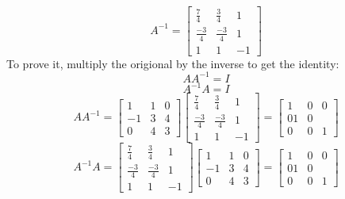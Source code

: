 \begin{example}
	\[\boxed{A^{-1} = \begin{bmatrix} \frac{7}{4} & \frac{3}{4} & 1\\ \frac{-3}{4} & \frac{-3}{4} & 1 \\ 1 & 1 & -1 \end{bmatrix} }\]
	To prove it, multiply the origional by the inverse to get the identity:
	\[A A^{-1} = I\]
	\[A^{-1} A = I\]
	\[A A^{-1} = \begin{bmatrix} 1 & 1 & 0 \\ -1 & 3 & 4 \\ 0 & 4 & 3 \end{bmatrix}\begin{bmatrix} \frac{7}{4} & \frac{3}{4} & 1\\ \frac{-3}{4} & \frac{-3}{4} & 1 \\ 1 & 1 & -1 \end{bmatrix} = \begin{bmatrix} 1& 0 & 0 \\ 0 1 & 0 \\ 0 & 0 & 1 \end{bmatrix} \]
	\[ A^{-1} A= \begin{bmatrix} \frac{7}{4} & \frac{3}{4} & 1\\ \frac{-3}{4} & \frac{-3}{4} & 1 \\ 1 & 1 & -1 \end{bmatrix}\begin{bmatrix} 1 & 1 & 0 \\ -1 & 3 & 4 \\ 0 & 4 & 3 \end{bmatrix} = \begin{bmatrix} 1& 0 & 0 \\ 0 1 & 0 \\ 0 & 0 & 1 \end{bmatrix} \]
\end{example}









\newpage


